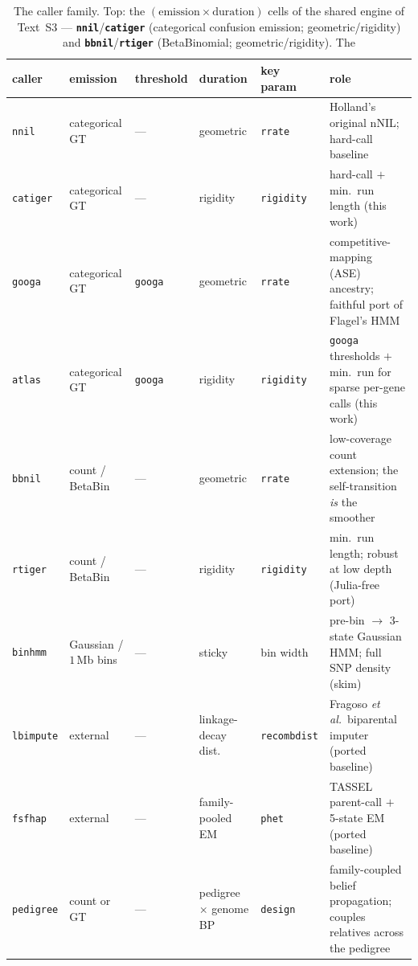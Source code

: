 \documentclass[11pt]{article}
\providecommand{\nnil}{\texttt{nnil}\xspace}
\providecommand{\bbnil}{\texttt{bbnil}\xspace}
\providecommand{\catiger}{\texttt{catiger}\xspace}
\providecommand{\rtiger}{\texttt{rtiger}\xspace}
\providecommand{\googa}{\texttt{googa}\xspace}
\providecommand{\atlas}{\texttt{atlas}\xspace}
\providecommand{\binhmm}{\texttt{binhmm}\xspace}
\providecommand{\lbimpute}{\texttt{lbimpute}\xspace}
\providecommand{\fsfhap}{\texttt{fsfhap}\xspace}
\providecommand{\pedigree}{\texttt{pedigree}\xspace}
\begin{document}
\begin{table}[tbp]
\centering
\footnotesize
\setlength{\tabcolsep}{3.5pt}
\begin{tabular}{@{}l l l l l >{\raggedright\arraybackslash}p{4.3cm}@{}}
\toprule
caller & emission & threshold & duration & key param & role \\
\midrule
\nnil      & categorical GT       & ---     & geometric            & \texttt{rrate}      & Holland's original nNIL; hard-call baseline \\
\catiger   & categorical GT       & ---     & rigidity             & \texttt{rigidity}   & hard-call $+$ min.\ run length (this work) \\
\googa     & categorical GT       & \googa   & geometric            & \texttt{rrate}      & competitive-mapping (ASE) ancestry; faithful port of Flagel's HMM \\
\atlas     & categorical GT       & \googa   & rigidity             & \texttt{rigidity}   & \googa thresholds $+$ min.\ run for sparse per-gene calls (this work) \\
\bbnil     & count / BetaBin      & ---     & geometric            & \texttt{rrate}      & low-coverage count extension; the self-transition \emph{is} the smoother \\
\rtiger    & count / BetaBin      & ---     & rigidity             & \texttt{rigidity}   & min.\ run length; robust at low depth (Julia-free port) \\
\midrule
\binhmm    & Gaussian / $1$\,Mb bins & ---  & sticky            & bin width           & pre-bin $\to$ 3-state Gaussian HMM; full SNP density (skim) \\
\lbimpute & external             & ---     & linkage-decay dist.\ & \texttt{recombdist} & Fragoso \emph{et al.}\ biparental imputer (ported baseline) \\
\fsfhap    & external             & ---     & family-pooled EM     & \texttt{phet}       & TASSEL parent-call $+$ 5-state EM (ported baseline) \\
\pedigree  & count or GT          & ---     & pedigree $\times$ genome BP & \texttt{design} & family-coupled belief propagation; couples relatives across the pedigree \\
\bottomrule
\end{tabular}
\caption{The caller family. Top: the $(\text{emission}\times\text{duration})$ cells of the
shared engine of Text~S3 --- \textbf{\nnil}/\textbf{\catiger} (categorical confusion emission;
geometric/rigidity) and \textbf{\bbnil}/\textbf{\rtiger} (BetaBinomial; geometric/rigidity). The
}
\end{table}
\end{document}
